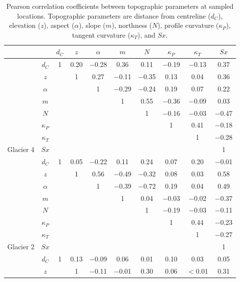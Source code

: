 \documentclass[12pt]{article}
\newcommand{\params}{Topographic parameters are distance from centreline ($d_C$), elevation ($z$), aspect ($\alpha$), slope ($m$), northness ($N$), profile curvature ($\kappa_P$), tangent curvature ($\kappa_T$), and $Sx$. }
\begin{document}
\begin{table}[H]
\centering
\caption{Pearson correlation coefficients between topographic parameters at sampled locations. \params}
\label{tab:pearson_correlation}
\begin{tabular}{cc|cccccccc}
 &  & $d_C$ & $z$ & $\alpha$ & $m$ & $N$ & $\kappa_P$ & $\kappa_T$ & $Sx$ \\ \hline
 
 & $d_C$ & 1 & 0.20 &  $-$0.28 & 0.36 & 0.11 &  $-$0.19 &  $-$0.13 & 0.37 \\
 
 & $z$ & & 1 & 0.27 &  $-$0.11 &  $-$0.35 & 0.13 & 0.04 & 0.36 \\
 
 & $\alpha$ & & & 1 &  $-$0.29 &  $-$0.24 & 0.19 & 0.07 & 0.22 \\
 
 & $m$ & & & & 1 & 0.55 &  $-$0.36 &  $-$0.09 & 0.03 \\
 
 & $N$ & & & & & 1 &  $-$0.16 &  $-$0.03 &  $-$0.47 \\
 
 & $\kappa_P$ & & & & & & 1 & 0.41 &  $-$0.18 \\
 
 & $\kappa_T$ & & & & & & & 1 &  $-$0.28 \\
 
\multirow{ -8}{*}{Glacier 4} & $Sx$ & & & & & & & & 1 \\ \hline
 & $d_C$ & 1 & 0.05 &  $-$0.22 & 0.11 & 0.24 & 0.07 & 0.20 &  $-$0.01 \\
 & $z$ & & 1 & 0.56 &  $-$0.49 &  $-$0.32 & 0.08 & 0.03 & 0.58 \\
 & $\alpha$ & & & 1 &  $-$0.39 &  $-$0.72 & 0.19 & 0.04 & 0.49 \\
 & $m$ & & & & 1 & 0.04 &  $-$0.03 &  $-$0.02 &  $-$0.37 \\
 & $N$ & & & & & 1 &  $-$0.19 &  $-$0.03 &  $-$0.11 \\
 & $\kappa_P$ & & & & & & 1 & 0.44 &  $-$0.23 \\
 & $\kappa_T$ & & & & & & & 1 &  $-$0.27 \\
\multirow{ -8}{*}{Glacier 2} & $Sx$ & & & & & & & & 1 \\ \hline
 
 & $d_C$ & 1 & 0.13 &  $-$0.09 & 0.06 & 0.01 & 0.10 & 0.03 & 0.05 \\
 
 & $z$ & & 1 &  $-$0.11 &  $-$0.01 & 0.30 & 0.06 &  $<$0.01 & 0.31 \\
 

\end{tabular}
\end{table}
\end{document}
